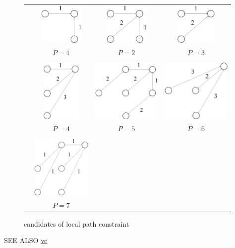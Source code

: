 \begin{figure}[htbp]
 \begin{center}
  \begin{tabular}{cccc} \\[-1ex]
   &\includegraphics[height=2cm]{fig/path1.eps}
   &\includegraphics[height=2cm]{fig/path2.eps}
   &\includegraphics[height=2cm]{fig/path3.eps}\\
   &$P=1$&$P=2$&$P=3$\\
   &&&\\
   &\includegraphics[height=3cm]{fig/path4.eps}
       &\includegraphics[height=3cm]{fig/path5.eps}
   &\includegraphics[height=3cm]{fig/path6.eps}\\
   &$P=4$&$P=5$&$P=6$\\
   &&&\\
   &\includegraphics[height=3cm]{fig/path7.eps}
       &&\\
   &$P=7$&&\\
  \end{tabular}
 \end{center}
 \caption{candidates of local path constraint}
 \label{fig:dtw_cand}
\end{figure}

\begin{qsection}{SEE ALSO}
\hyperlink{vc}{vc}
\end{qsection}
